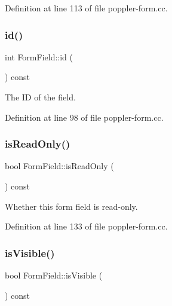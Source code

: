 Definition at line 113 of file poppler-\/form.\+cc.

\mbox{\label{class_poppler_1_1_form_field_a2ed85b3b8cb5258c06a924e11316a290}} 
\subsubsection{\texorpdfstring{id()}{id()}}
{\footnotesize\ttfamily int Form\+Field\+::id (\begin{DoxyParamCaption}{ }\end{DoxyParamCaption}) const}

The ID of the field. 

Definition at line 98 of file poppler-\/form.\+cc.

\mbox{\label{class_poppler_1_1_form_field_a03fcab88eb5e93cec0b64c086219b8de}} 
\subsubsection{\texorpdfstring{is\+Read\+Only()}{isReadOnly()}}
{\footnotesize\ttfamily bool Form\+Field\+::is\+Read\+Only (\begin{DoxyParamCaption}{ }\end{DoxyParamCaption}) const}

Whether this form field is read-\/only. 

Definition at line 133 of file poppler-\/form.\+cc.

\mbox{\label{class_poppler_1_1_form_field_ac6b13fb33bab5a7fe11df56fdf607c87}} 
\subsubsection{\texorpdfstring{is\+Visible()}{isVisible()}}
{\footnotesize\ttfamily bool Form\+Field\+::is\+Visible (\begin{DoxyParamCaption}{ }\end{DoxyParamCaption}) const}

